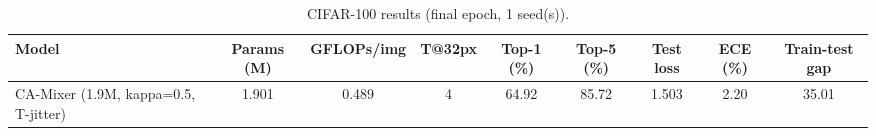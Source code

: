 \begin{table}[t]\centering\small
\caption{CIFAR-100 results (final epoch, 1 seed(s)).}
\begin{tabular}{lcccccccc}
\toprule
Model & Params (M) & GFLOPs/img & T@32px & Top-1 (\%) & Top-5 (\%) & Test loss & ECE (\%) & Train-test gap \\
\midrule
CA-Mixer (1.9M, kappa=0.5, T-jitter) & 1.901 & 0.489 & 4 & 64.92 & 85.72 & 1.503 & 2.20 & 35.01 \\
\bottomrule
\end{tabular}
\end{table}